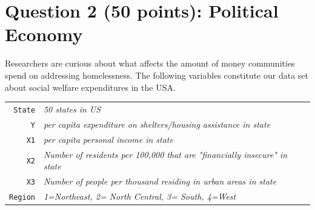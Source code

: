 \documentclass[12pt,letterpaper]{article}
\begin{document}
\newpage

	\section*{Question 2 (50 points): Political Economy}

\noindent Researchers are curious about what affects the amount of money communities spend on addressing homelessness. The following variables constitute our data set about social welfare expenditures in the USA. \\
\vspace{.5cm}


\begin{tabular}{r|l}
	\texttt{State} &\emph{50 states in US} \\
	\texttt{Y} & \emph{per capita expenditure on shelters/housing assistance in state}\\
	\texttt{X1} &\emph{per capita personal income in state} \\
	\texttt{X2} &  \emph{Number of residents per 100,000 that are "financially insecure" in state}\\
	\texttt{X3} &  \emph{Number of people per thousand residing in urban areas in state} \\
	\texttt{Region} &  \emph{1=Northeast, 2= North Central, 3= South, 4=West} \\
\end{tabular}
\end{document}
